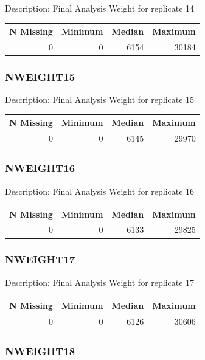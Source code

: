 \documentclass[
]{krantz}
\begin{document}
Description: Final Analysis Weight for replicate 14

\begin{tabular}[t]{r|r|r|r}
\hline
N Missing & Minimum & Median & Maximum\\
\hline
0 & 0 & 6154 & 30184\\
\hline
\end{tabular}

\hypertarget{nweight15}{%
\subsubsection*{NWEIGHT15}\label{nweight15}}


Description: Final Analysis Weight for replicate 15

\begin{tabular}[t]{r|r|r|r}
\hline
N Missing & Minimum & Median & Maximum\\
\hline
0 & 0 & 6145 & 29970\\
\hline
\end{tabular}

\hypertarget{nweight16}{%
\subsubsection*{NWEIGHT16}\label{nweight16}}


Description: Final Analysis Weight for replicate 16

\begin{tabular}[t]{r|r|r|r}
\hline
N Missing & Minimum & Median & Maximum\\
\hline
0 & 0 & 6133 & 29825\\
\hline
\end{tabular}

\hypertarget{nweight17}{%
\subsubsection*{NWEIGHT17}\label{nweight17}}


Description: Final Analysis Weight for replicate 17

\begin{tabular}[t]{r|r|r|r}
\hline
N Missing & Minimum & Median & Maximum\\
\hline
0 & 0 & 6126 & 30606\\
\hline
\end{tabular}

\hypertarget{nweight18}{%
\subsubsection*{NWEIGHT18}\label{nweight18}}
\end{document}
